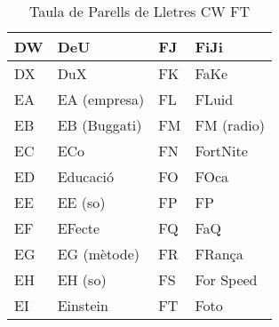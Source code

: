 \begin{table}[!ht]
\begin{tabular}{|l|l|l|l|}
    DW & DeU               & FJ & FiJi                  \\ \hline
    DX & DuX               & FK & FaKe                  \\ \hline
    EA & EA (empresa)      & FL & FLuid                 \\ \hline
    EB & EB (Buggati)      & FM & FM (radio)            \\ \hline
    EC & ECo               & FN & FortNite              \\ \hline
    ED & Educació          & FO & FOca                  \\ \hline
    EE & EE (so)           & FP & FP                    \\ \hline
    EF & EFecte            & FQ & FaQ                   \\ \hline
    EG & EG (mètode)       & FR & FRança                \\ \hline
    EH & EH (so)           & FS & For Speed             \\ \hline
    EI & Einstein          & FT & Foto                  \\ \hline  
    \end{tabular}
    \caption{Taula de Parells de Lletres CW \rightarrow FT}
    \label{tla:lletres-2}
    \end{table}


